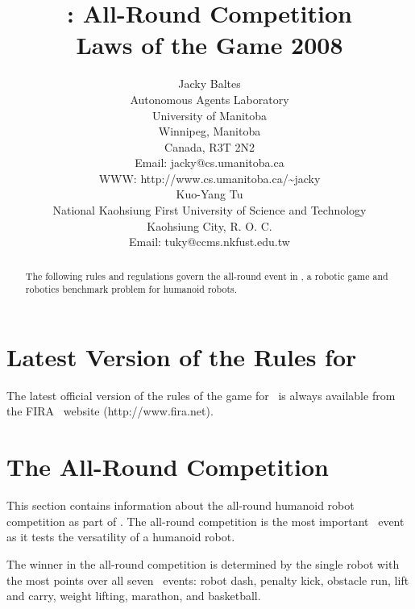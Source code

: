 \documentclass[12pt]{hurocup}
\begin{document}
\title{\HuroCup: All-Round Competition\\
  Laws of the Game 2008}


\author{Jacky Baltes\\
Autonomous Agents Laboratory\\
University of Manitoba\\
Winnipeg, Manitoba\\
Canada, R3T 2N2\\
Email: jacky@cs.umanitoba.ca\\
WWW: http://www.cs.umanitoba.ca/\~{ }jacky\\[5mm]
Kuo-Yang Tu\\
National Kaohsiung First University of Science and Technology\\
Kaohsiung City, R. O. C.\\
Email: tuky@ccms.nkfust.edu.tw\\
}

\maketitle
\begin{abstract}
The following rules and regulations govern the all-round event in
\HuroCup, a robotic game and robotics benchmark problem for humanoid
robots.
%
\end{abstract}

\section*{Latest Version of the Rules for \HuroCup}
\label{sec:updates}

The latest official version of the rules of the game for \HuroCup\ is
always available from the FIRA \HuroCup\ website (http://www.fira.net).

\newpage

\section{The All-Round Competition}
\label{sec:all-round} 

This section contains information about the all-round humanoid robot
competition as part of \HuroCup. The all-round competition is the most
important \HuroCup\ event as it tests the versatility of a humanoid
robot. 

The winner in the all-round competition is determined by the single
robot with the most points over all seven \HuroCup\ events: robot dash,
penalty kick, obstacle run, lift and carry, weight lifting, marathon,
and basketball.
\end{document}
